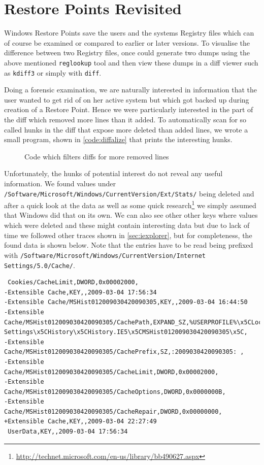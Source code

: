 \documentclass[a4paper,
    11pt,
    normalheadings,
    parindent,
    UKenglish,
    abstracton,
    ]{scrartcl}
\begin{document}
\section{Restore Points Revisited}
Windows Restore Points save the users and the systems Registry files which can of course be examined or compared to earlier or later versions.
To visualise the difference between two Registry files, once could generate two dumps using the above mentioned \texttt{reglookup} tool and then view these dumps in a diff viewer such as \texttt{kdiff3} or simply with \texttt{diff}.

Doing a forensic examination, we are naturally interested in information that the user wanted to get rid of on her active system but which got backed up during creation of a Restore Point.
Hence we were particularly interested in the part of the diff which removed more lines than it added.
To automatically scan for so called hunks in the diff that expose more deleted than added lines, we wrote a small program, shown in \autoref{code:diffalize} that prints the interesting hunks.

\begin{figure}
    
    \caption{Code which filters diffs for more removed lines}%
    \label{code:diffalize}
\end{figure}

Unfortunately, the hunks of potential interest do not reveal any useful information.
We found values under
\texttt{/Software/Microsoft/Windows/CurrentVersion/Ext/Stats/} being deleted and after a quick look at the data as well as some quick research\footnote{\url{http://technet.microsoft.com/en-us/library/bb490627.aspx}} we simply assumed that Windows did that on its own.
We can also see other other keys where values which were deleted and these might contain interesting data but due to lack of time we followed other traces shown in \autoref{sec:iexplorer},
but for completeness, the found data is shown below.
Note that the entries have to be read being prefixed with \texttt{/Software/Microsoft/Windows/CurrentVersion/Internet Settings/5.0/Cache/}.
\begin{verbatim}
 Cookies/CacheLimit,DWORD,0x00002000,
-Extensible Cache,KEY,,2009-03-04 17:56:34
-Extensible Cache/MSHist012009030420090305,KEY,,2009-03-04 16:44:50
-Extensible Cache/MSHist012009030420090305/CachePath,EXPAND_SZ,%USERPROFILE%\x5CLocal Settings\x5CHistory\x5CHistory.IE5\x5CMSHist012009030420090305\x5C,
-Extensible Cache/MSHist012009030420090305/CachePrefix,SZ,:2009030420090305: ,
-Extensible Cache/MSHist012009030420090305/CacheLimit,DWORD,0x00002000,
-Extensible Cache/MSHist012009030420090305/CacheOptions,DWORD,0x0000000B,
-Extensible Cache/MSHist012009030420090305/CacheRepair,DWORD,0x00000000,
+Extensible Cache,KEY,,2009-03-04 22:27:49
 UserData,KEY,,2009-03-04 17:56:34
\end{verbatim}
\end{document}
